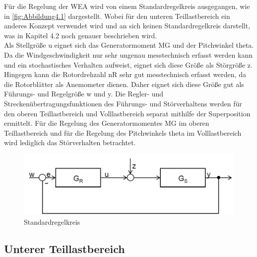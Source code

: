 Für die Regelung der WEA wird von einem Standardregelkreis ausgegangen, wie in \autoref{fig:Abbildung4.1} dargestellt. Wobei für den unteren Teillastbereich ein anderes Konzept verwendet wird und an sich keinen Standardregelkreis darstellt, was in Kapitel 4.2 noch genauer beschrieben wird.
\\
Als Stellgröße u eignet sich das Generatormoment \acs{MG} und der Pitchwinkel \acs{theta}. Da die Windgeschwindigkeit nur sehr ungenau messtechnisch erfasst werden kann und ein stochastisches Verhalten aufweist, eignet sich diese Größe als Störgröße z. Hingegen kann die Rotordrehzahl \acs{nR} sehr gut messtechnisch erfasst werden, da die Rotorblätter als Anemometer dienen. Daher eignet sich diese Größe gut als Führungs- und Regelgröße w und y. Die Regler- und Streckenübertragungsfunktionen des Führungs- und Störverhaltens werden für den oberen Teillastbereich und Volllastbereich separat mithilfe der Superposition ermittelt. Für die Regelung des Generatormomentes \acs{MG} im oberen Teillastbereich und für die Regelung des Pitchwinkels \acs{theta} im Volllastbereich wird lediglich das Störverhalten betrachtet.

\begin{figure}[H]
    \centering
    \includegraphics[scale=0.45]{Bilder/Kapitel 6/Standardregelkreis.PNG}
    \caption{Standardregelkreis}
    \label{fig:Abbildung4.1}
\end{figure}

\subsection{Unterer Teillastbereich}

